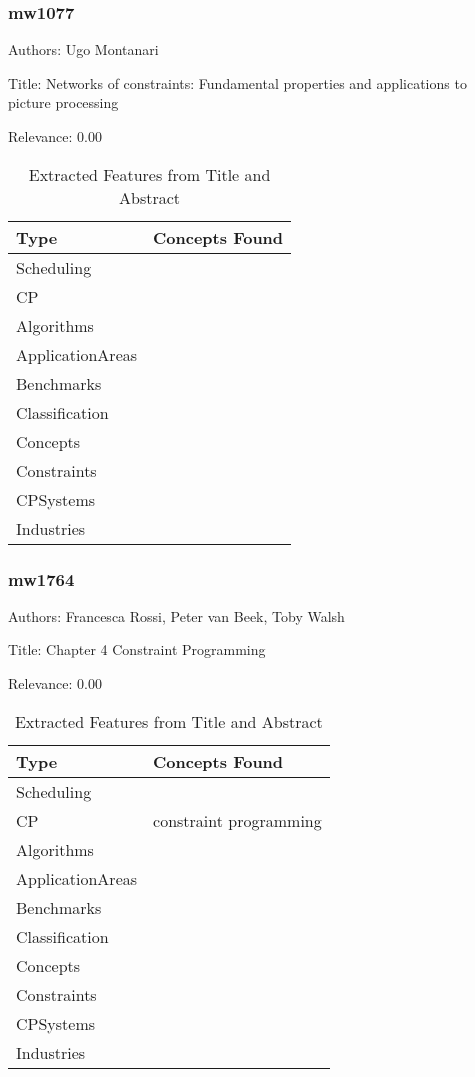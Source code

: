 \subsubsection{mw1077}
\label{mw:mw1077}

Authors: Ugo Montanari

Title: Networks of constraints: Fundamental properties and applications to picture processing

Relevance:  0.00

{\scriptsize
\begin{longtable}{p{2cm}p{20cm}}
\caption{Extracted Features from Title and Abstract}\\ \toprule
Type & Concepts Found\\ \midrule
\endhead
\bottomrule
\endfoot
Scheduling & \\ 
CP & \\ 
Algorithms & \\ 
ApplicationAreas & \\ 
Benchmarks & \\ 
Classification & \\ 
Concepts & \\ 
Constraints & \\ 
CPSystems & \\ 
Industries & \\ 
\end{longtable}
}



\subsubsection{mw1764}
\label{mw:mw1764}

Authors: Francesca Rossi, Peter van Beek, Toby Walsh

Title: Chapter 4 Constraint Programming

Relevance:  0.00

{\scriptsize
\begin{longtable}{p{2cm}p{20cm}}
\caption{Extracted Features from Title and Abstract}\\ \toprule
Type & Concepts Found\\ \midrule
\endhead
\bottomrule
\endfoot
Scheduling & \\ 
CP & constraint programming\\ 
Algorithms & \\ 
ApplicationAreas & \\ 
Benchmarks & \\ 
Classification & \\ 
Concepts & \\ 
Constraints & \\ 
CPSystems & \\ 
Industries & \\ 
\end{longtable}
}



